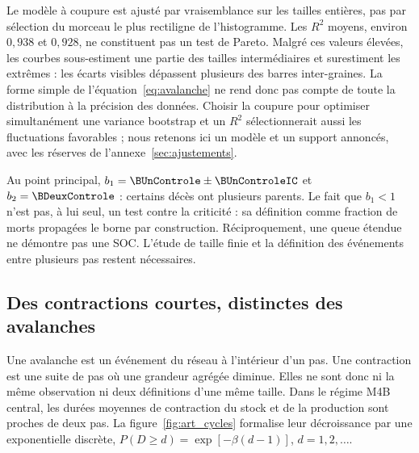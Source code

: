 
Le modèle à coupure est ajusté par vraisemblance sur les tailles entières,
pas par sélection du morceau le plus rectiligne de l'histogramme. Les
$R^2$ moyens, environ $0{,}938$ et $0{,}928$, ne constituent pas un test
de Pareto. Malgré ces valeurs élevées, les courbes sous-estiment une partie
des tailles intermédiaires et surestiment les extrêmes : les écarts visibles
dépassent plusieurs des barres inter-graines. La forme simple
de l'équation~\eqref{eq:avalanche} ne rend donc pas compte de toute la
distribution à la précision des données. Choisir la coupure pour
optimiser simultanément une variance bootstrap et un $R^2$ sélectionnerait
aussi les fluctuations favorables ; nous retenons ici un modèle et un support
annoncés, avec les réserves de l'annexe~\ref{sec:ajustements}.

Au point principal, $b_1=\BUnControle\pm\BUnControleIC$ et
$b_2=\BDeuxControle$ : certains décès ont plusieurs parents. Le fait que
$b_1<1$ n'est pas, à lui seul, un test contre la criticité : sa définition
comme fraction de morts propagées le borne par construction. Réciproquement,
une queue étendue ne démontre pas une SOC. L'étude de taille finie et la
définition des événements entre plusieurs pas restent nécessaires.

\subsection{Des contractions courtes, distinctes des avalanches}
Une avalanche est un événement du réseau à l'intérieur d'un pas. Une
contraction est une suite de pas où une grandeur agrégée diminue. Elles ne
sont donc ni la même observation ni deux définitions d'une même taille.
Dans le régime M4B central, les durées moyennes de contraction du stock et
de la production sont proches de deux pas. La figure~\ref{fig:art_cycles}
formalise leur décroissance par une exponentielle discrète,
$P(D\ge d)=\exp[-\beta(d-1)]$, $d=1,2,\ldots$.

